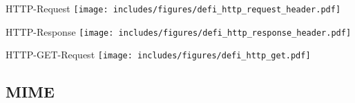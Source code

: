\begin{defi}{HTTP-Request}
    \centering
    \texttt{[image: includes/figures/defi\_http\_request\_header.pdf]}
\end{defi}

\begin{defi}{HTTP-Response}
    \centering
    \texttt{[image: includes/figures/defi\_http\_response\_header.pdf]}
\end{defi}

\begin{example}{HTTP-GET-Request}
    \centering
    \texttt{[image: includes/figures/defi\_http\_get.pdf]}
\end{example}

\subsection{MIME}

